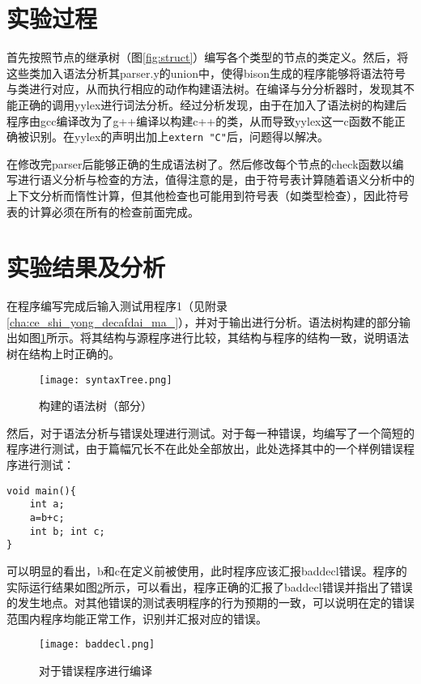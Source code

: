 \section{实验过程}
\label{sec:shi_yan_bu_zou_2}
\par 首先按照节点的继承树（图\ref{fig:struct}）编写各个类型的节点的类定义。然后，将这些类加入语法分析其parser.y的union中，使得bison生成的程序能够将语法符号与类进行对应，从而执行相应的动作构建语法树。在编译与分分析器时，发现其不能正确的调用yylex进行词法分析。经过分析发现，由于在加入了语法树的构建后程序由gcc编译改为了g++编译以构建c++的类，从而导致yylex这一c函数不能正确被识别。在yylex的声明出加上\lstinline|extern "C"|后，问题得以解决。
\par 在修改完parser后能够正确的生成语法树了。然后修改每个节点的check函数以编写进行语义分析与检查的方法，值得注意的是，由于符号表计算随着语义分析中的上下文分析而惰性计算，但其他检查也可能用到符号表（如类型检查），因此符号表的计算必须在所有的检查前面完成。

\section{实验结果及分析}
\label{sec:shi_yan_jie_guo_ji_fen_xi_2}
\par 在程序编写完成后输入测试用程序1（见附录\ref{cha:ce_shi_yong_decafdai_ma_}），并对于输出进行分析。语法树构建的部分输出如图\ref{fig:syntaxTree}所示。将其结构与源程序进行比较，其结构与程序的结构一致，说明语法树在结构上时正确的。

\begin{figure}[htpb]
    \centering
    \texttt{[image: syntaxTree.png]}
    \caption{构建的语法树（部分）}
    \label{fig:syntaxTree}
\end{figure}

\par 然后，对于语法分析与错误处理进行测试。对于每一种错误，均编写了一个简短的程序进行测试，由于篇幅冗长不在此处全部放出，此处选择其中的一个样例错误程序进行测试：
\begin{lstlisting}
void main(){
    int a;
    a=b+c;
    int b; int c;
}
\end{lstlisting}
\par 可以明显的看出，b和c在定义前被使用，此时程序应该汇报baddecl错误。程序的实际运行结果如图\ref{fig:baddecl}所示，可以看出，程序正确的汇报了baddecl错误并指出了错误的发生地点。对其他错误的测试表明程序的行为预期的一致，可以说明在定的错误范围内程序均能正常工作，识别并汇报对应的错误。
\begin{figure}[htpb]
    \centering
    \texttt{[image: baddecl.png]}
    \caption{对于错误程序进行编译}
    \label{fig:baddecl}
\end{figure}

